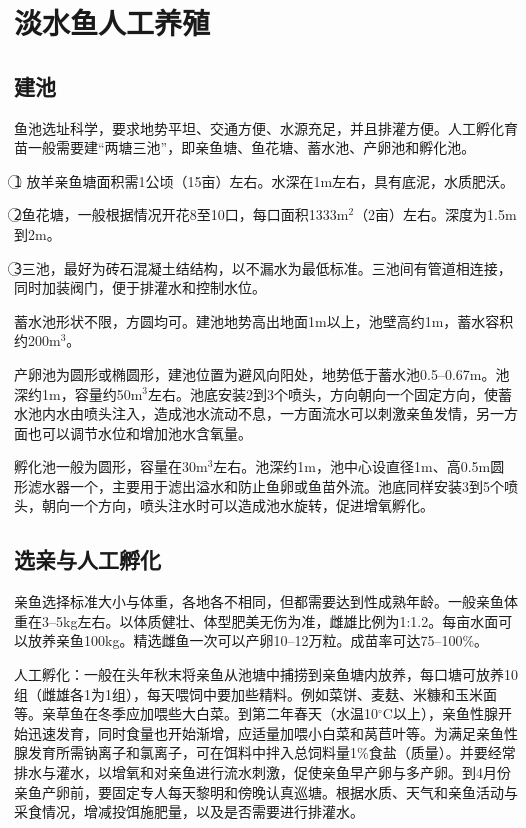 \documentclass{ctexbook}
\begin{document}
\section{淡水鱼人工养殖}
\subsection{建池}
鱼池选址科学，要求地势平坦、交通方便、水源充足，并且排灌方便。人工孵化育苗一般需要建“两塘三池”，即亲鱼塘、鱼花塘、蓄水池、产卵池和孵化池。

\textcircled{1} 放羊亲鱼塘面积需1公顷（15亩）左右。水深在1m左右，具有底泥，水质肥沃。

\textcircled{2}鱼花塘，一般根据情况开花8至10口，每口面积1333m$^{2}$（2亩）左右。深度为1.5m到2m。

\textcircled{3}三池，最好为砖石混凝土结结构，以不漏水为最低标准。三池间有管道相连接，同时加装阀门，便于排灌水和控制水位。

蓄水池形状不限，方圆均可。建池地势高出地面1m以上，池壁高约1m，蓄水容积约200m$^{3}$。

产卵池为圆形或椭圆形，建池位置为避风向阳处，地势低于蓄水池0.5--0.67m。池深约1m，容量约50m$^{3}$左右。池底安装2到3个喷头，方向朝向一个固定方向，使蓄水池内水由喷头注入，造成池水流动不息，一方面流水可以刺激亲鱼发情，另一方面也可以调节水位和增加池水含氧量。

孵化池一般为圆形，容量在30m$^{3}$左右。池深约1m，池中心设直径1m、高0.5m圆形滤水器一个，主要用于滤出溢水和防止鱼卵或鱼苗外流。池底同样安装3到5个喷头，朝向一个方向，喷头注水时可以造成池水旋转，促进增氧孵化。
\subsection{选亲与人工孵化}
亲鱼选择标准大小与体重，各地各不相同，但都需要达到性成熟年龄。一般亲鱼体重在3--5kg左右。以体质健壮、体型肥美无伤为准，雌雄比例为1:1.2。每亩水面可以放养亲鱼100kg。精选雌鱼一次可以产卵10--12万粒。成苗率可达75--100\%。

人工孵化：一般在头年秋末将亲鱼从池塘中捕捞到亲鱼塘内放养，每口塘可放养10组（雌雄各1为1组），每天喂饲中要加些精料。例如菜饼、麦麸、米糠和玉米面等。亲草鱼在冬季应加喂些大白菜。到第二年春天（水温10$^{\circ}$C以上），亲鱼性腺开始迅速发育，同时食量也开始渐增，应适量加喂小白菜和莴苣叶等。为满足亲鱼性腺发育所需钠离子和氯离子，可在饵料中拌入总饲料量1\%食盐（质量）。并要经常排水与灌水，以增氧和对亲鱼进行流水刺激，促使亲鱼早产卵与多产卵。到4月份亲鱼产卵前，要固定专人每天黎明和傍晚认真巡塘。根据水质、天气和亲鱼活动与采食情况，增减投饵施肥量，以及是否需要进行排灌水。
\end{document}
